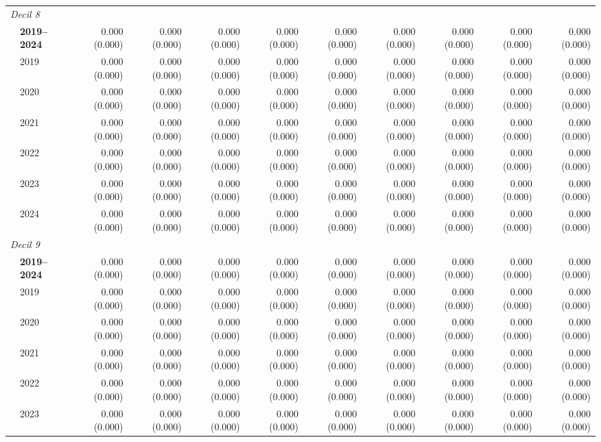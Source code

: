 \begin{table}[htbp]
\begin{tabular}{llrrrrrrrrr}
\midrule
\multicolumn{11}{l}{\textit{Decil 8}} \\
 & \textbf{2019–2024} & 0.000 (0.000) & 0.000 (0.000) & 0.000 (0.000) & 0.000 (0.000) & 0.000 (0.000) & 0.000 (0.000) & 0.000 (0.000) & 0.000 (0.000) & 0.000 (0.000) \\
 & 2019 & 0.000 (0.000) & 0.000 (0.000) & 0.000 (0.000) & 0.000 (0.000) & 0.000 (0.000) & 0.000 (0.000) & 0.000 (0.000) & 0.000 (0.000) & 0.000 (0.000) \\
 & 2020 & 0.000 (0.000) & 0.000 (0.000) & 0.000 (0.000) & 0.000 (0.000) & 0.000 (0.000) & 0.000 (0.000) & 0.000 (0.000) & 0.000 (0.000) & 0.000 (0.000) \\
 & 2021 & 0.000 (0.000) & 0.000 (0.000) & 0.000 (0.000) & 0.000 (0.000) & 0.000 (0.000) & 0.000 (0.000) & 0.000 (0.000) & 0.000 (0.000) & 0.000 (0.000) \\
 & 2022 & 0.000 (0.000) & 0.000 (0.000) & 0.000 (0.000) & 0.000 (0.000) & 0.000 (0.000) & 0.000 (0.000) & 0.000 (0.000) & 0.000 (0.000) & 0.000 (0.000) \\
 & 2023 & 0.000 (0.000) & 0.000 (0.000) & 0.000 (0.000) & 0.000 (0.000) & 0.000 (0.000) & 0.000 (0.000) & 0.000 (0.000) & 0.000 (0.000) & 0.000 (0.000) \\
 & 2024 & 0.000 (0.000) & 0.000 (0.000) & 0.000 (0.000) & 0.000 (0.000) & 0.000 (0.000) & 0.000 (0.000) & 0.000 (0.000) & 0.000 (0.000) & 0.000 (0.000) \\
\midrule
\multicolumn{11}{l}{\textit{Decil 9}} \\
 & \textbf{2019–2024} & 0.000 (0.000) & 0.000 (0.000) & 0.000 (0.000) & 0.000 (0.000) & 0.000 (0.000) & 0.000 (0.000) & 0.000 (0.000) & 0.000 (0.000) & 0.000 (0.000) \\
 & 2019 & 0.000 (0.000) & 0.000 (0.000) & 0.000 (0.000) & 0.000 (0.000) & 0.000 (0.000) & 0.000 (0.000) & 0.000 (0.000) & 0.000 (0.000) & 0.000 (0.000) \\
 & 2020 & 0.000 (0.000) & 0.000 (0.000) & 0.000 (0.000) & 0.000 (0.000) & 0.000 (0.000) & 0.000 (0.000) & 0.000 (0.000) & 0.000 (0.000) & 0.000 (0.000) \\
 & 2021 & 0.000 (0.000) & 0.000 (0.000) & 0.000 (0.000) & 0.000 (0.000) & 0.000 (0.000) & 0.000 (0.000) & 0.000 (0.000) & 0.000 (0.000) & 0.000 (0.000) \\
 & 2022 & 0.000 (0.000) & 0.000 (0.000) & 0.000 (0.000) & 0.000 (0.000) & 0.000 (0.000) & 0.000 (0.000) & 0.000 (0.000) & 0.000 (0.000) & 0.000 (0.000) \\
 & 2023 & 0.000 (0.000) & 0.000 (0.000) & 0.000 (0.000) & 0.000 (0.000) & 0.000 (0.000) & 0.000 (0.000) & 0.000 (0.000) & 0.000 (0.000) & 0.000 (0.000) \\

\end{tabular}
\end{table}
